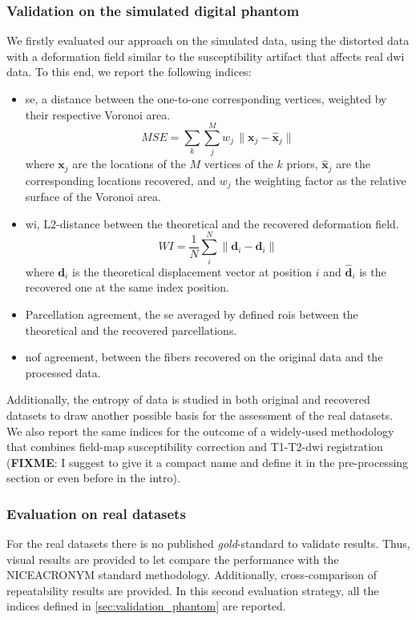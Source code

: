 \subsubsection{Validation on the simulated digital phantom} %
\label{sec:validation_phantom}
We firstly evaluated our approach on the simulated data, using
the distorted data with a deformation field similar to the
susceptibility artifact that affects real \gls{dwi} data. To 
this end, we report the following indices:
\begin{itemize}
\item \gls{se}, a distance between the one-to-one corresponding
vertices, weighted by their respective Voronoi area.
\begin{equation}
MSE = \sum\limits_k \sum\limits_j^M w_j\,\| \mathbf{x}_j - \hat{\mathbf{x}}_j \|
\end{equation}
where $\mathbf{x}_j$ are the locations of the $M$ vertices of the $k$ priors,
$\hat{\mathbf{x}}_j$ are the corresponding locations recovered, and $w_j$ the
weighting factor as the relative surface of the Voronoi area.
\item \gls{wi}, L2-distance between the theoretical and the recovered
deformation field.
\begin{equation}
WI = \frac{1}{N} \sum\limits_i^N \| \mathbf{d}_i - \hat{\mathbf{d}}_i \|
\end{equation}
where $\mathbf{d}_i$ is the theoretical displacement vector at position $i$
and $\hat{\mathbf{d}}_i$ is the recovered one at the same index position.
\item Parcellation agreement, the \gls{se} averaged by defined \glspl{roi}
between the theoretical and the recovered parcellations.
\item \gls{nof} agreement, between the fibers recovered on the original
data and the processed data.
\end{itemize}

Additionally, the entropy of data is studied in both
original and recovered datasets to draw another possible basis for the 
assessment of the real datasets. We also report the same indices for the
outcome of a widely-used methodology that combines field-map susceptibility 
correction and T1-T2-\gls{dwi} registration (\textbf{FIXME}: I suggest to give 
it a compact name and define it in the pre-processing section or even before
in the intro).

\subsubsection{Evaluation on real datasets}
For the real datasets there is no published \emph{gold}-standard to validate results.
Thus, visual results are provided to let compare the performance with the NICEACRONYM
standard methodology. Additionally, cross-comparison of repeatability results are 
provided. In this second evaluation strategy, all the indices defined in 
\autoref{sec:validation_phantom} are reported.
